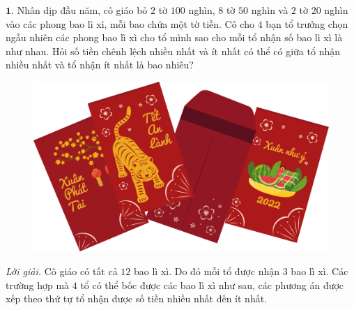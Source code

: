 \begin{multicols}{2}
	$\pmb{1.}$ Nhân dịp đầu năm, cô giáo bỏ $2$ tờ $100$ nghìn, $8$ tờ $50$ nghìn và $2$ tờ $20$ nghìn vào các phong bao lì xì, mỗi bao chứa một tờ tiền. Cô cho $4$ bạn tổ trưởng chọn ngẫu nhiên các phong bao lì xì cho tổ mình sao cho mỗi tổ nhận số bao lì xì là như nhau. Hỏi số tiền \linebreak chênh lệch nhiều nhất và ít nhất có thể có giữa tổ nhận nhiều nhất và tổ nhận ít nhất là bao nhiêu? 
	\begin{figure}[H]
		\centering
		\vspace*{-5pt}
		\captionsetup{labelformat= empty, justification=centering}
		\includegraphics[width=1\linewidth]{Pi3_Bai1}
		\vspace*{-15pt}
	\end{figure}
	\textit{Lời giải.} Cô giáo có tất cả $12$ bao lì xì. Do đó mỗi tổ được nhận $3$ bao lì xì. 
	\vskip 0.1cm
	Các trường hợp mà $4$ tổ có thể bốc được các bao lì xì như sau, các phương án được xếp theo thứ tự tổ nhận được số tiền nhiều nhất đến ít nhất.
	\begin{table}[H]
		\vspace*{5pt}
		\renewcommand{\arraystretch}{2.5}
\end{table}
\end{multicols}
